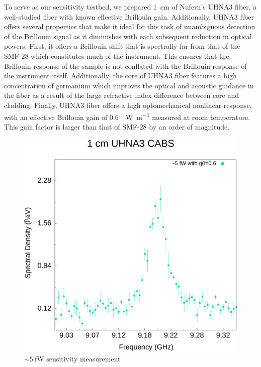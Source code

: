 To serve as our sensitivity testbed, we prepared \SI{1}{\centi\meter} of Nufern's \acl{UHNA3} fiber, a well-studied fiber with known effective Brillouin gain\cite{behunin2015long}. Additionally, \ac{UHNA3} fiber offers several properties that make it ideal for this task of unambiguous detection of the Brillouin signal as it diminishes with each subsequent reduction in optical powers. First, it offers a Brillouin shift that is spectrally far from that of the \ac{SMF-28} which constitutes much of the instrument. This ensures that the Brillouin response of the sample is not conflated with the Brillouin response of the instrument itself. Additionally, the core of \ac{UHNA3} fiber features a high concentration of germanium which improves the optical and acoustic guidance in the fiber as a result of the large refractive index difference between core and cladding. Finally, \ac{UHNA3} fiber offers a high optomechanical nonlinear response, with an effective Brillouin gain of \SI{0.6}{\per\watt\per\meter} measured at room temperature\cite{behunin2015long}. This gain factor is larger than that of \ac{SMF-28} by an order of magnitude\cite{nikles1997brillouin}.

\begin{figure}[t!]
  \centering
  \includegraphics[width=\textwidth]{figs/4-CoBS/5fWSensitivity.pdf}
  \caption{\(\sim\SI{5}{\femto\watt}\) sensitivity measurement}
  \label{fig:5fWSensitivity}
\end{figure}


